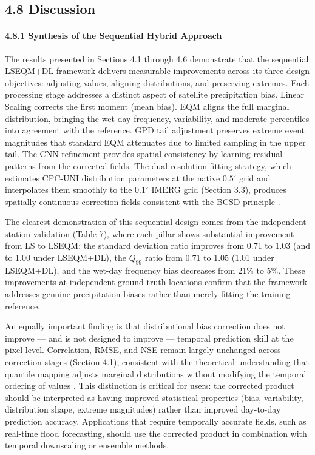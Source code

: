 \documentclass[
]{article}
\begin{document}
\subsection{4.8 Discussion}\label{discussion}

\paragraph{4.8.1 Synthesis of the Sequential Hybrid
Approach}

The results presented in Sections 4.1 through 4.6 demonstrate that the
sequential LSEQM+DL framework delivers measurable improvements across
its three design objectives: adjusting values, aligning distributions,
and preserving extremes. Each processing stage addresses a distinct
aspect of satellite precipitation bias. Linear Scaling corrects the
first moment (mean bias). EQM aligns the full marginal distribution,
bringing the wet-day frequency, variability, and moderate percentiles
into agreement with the reference. GPD tail adjustment preserves extreme
event magnitudes that standard EQM attenuates due to limited sampling in
the upper tail. The CNN refinement provides spatial consistency by
learning residual patterns from the corrected fields. The
dual-resolution fitting strategy, which estimates CPC-UNI distribution
parameters at the native \(0.5^{\circ}\) grid and interpolates them
smoothly to the \(0.1^{\circ}\) IMERG grid (Section 3.3), produces
spatially continuous correction fields consistent with the BCSD
principle \cite{ref23}.

The clearest demonstration of this sequential design comes from the
independent station validation (Table 7), where each pillar shows
substantial improvement from LS to LSEQM: the standard deviation ratio
improves from 0.71 to 1.03 (and to 1.00 under LSEQM+DL), the \(Q_{99}\)
ratio from 0.71 to 1.05 (1.01 under LSEQM+DL), and the wet-day frequency
bias decreases from 21\% to 5\%. These improvements at independent
ground truth locations confirm that the framework addresses genuine
precipitation biases rather than merely fitting the training reference.

An equally important finding is that distributional bias correction does
not improve --- and is not designed to improve --- temporal prediction
skill at the pixel level. Correlation, RMSE, and NSE remain largely
unchanged across correction stages (Section 4.1), consistent with the
theoretical understanding that quantile mapping adjusts marginal
distributions without modifying the temporal ordering of values
\cite{ref34}. This distinction is critical for users: the corrected product
should be interpreted as having improved statistical properties (bias,
variability, distribution shape, extreme magnitudes) rather than
improved day-to-day prediction accuracy. Applications that require
temporally accurate fields, such as real-time flood forecasting, should
use the corrected product in combination with temporal downscaling or
ensemble methods.
\end{document}
